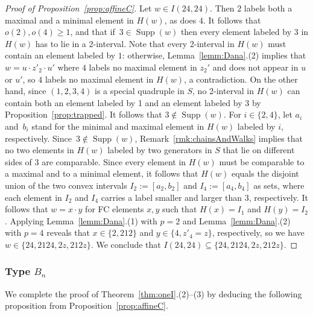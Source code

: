 \documentclass[ALCO,Unicode,published]{cedram}
\newcommand{\se}{\subseteq}
\DeclareMathOperator{\supp}{\mathrm{Supp}}
\begin{document}
\begin{proof}[Proof of Proposition~\ref{prop:affineC}]
    Let $w\in I(24,24)$.  Then $2$ labels both a maximal and a minimal element in $H(w)$, as does $4$.
    It follows that $o(2),o(4)\ge 1$, and that if~$3\in \supp(w)$ then every element labeled by $3$ in
    $H(w)$ has to lie in a 2-interval.  Note that every 2-interval in $H(w)$ must contain an element
    labeled by $1$: otherwise, Lemma~\ref{lemm:Dana}.(2) implies that $w=u\cdot z'_2\cdot u'$ where $4$
    labels no maximal element in $z_2'$ and does not appear in $u$ or $u'$, so $4$ labels no maximal
    element in $H(w)$, a contradiction.  On the other hand, since $(1,2,3,4)$ is a special quadruple
    in $S$, no 2-interval in $H(w)$ can contain both an element labeled by 1 and an element labeled
    by 3 by Proposition~\ref{prop:trapped}. It follows that $3\notin\supp(w)$.  For $i\in \{2,4\}$, let $a_i$
    and~$b_i$ stand for the minimal and maximal element in $H(w)$ labeled by $i$, respectively.
    Since~$3\notin\supp(w)$, Remark~\ref{rmk:chainsAndWalks} implies that no two elements in $H(w)$
    labeled by two generators in $S$ that lie on different sides of 3 are comparable. Since every
    element in $H(w)$ must be comparable to a maximal and to a minimal element, it follows that
    $H(w)$ equals the disjoint union of the two convex intervals $I_2:=[a_2,b_2]$ and
    $I_4:=[a_4,b_4]$ as sets, where each element in $I_2$ and $I_4$ carries a label smaller and
    larger than 3, respectively. It follows that $w=x\cdot y$ for FC elements $x,y$ such that
    $H(x)=I_1$ and $H(y)=I_2$. Applying Lemma~\ref{lemm:Dana}.(1) with $p=2$ and Lemma~\ref{lemm:Dana}.(2)
    with $p=4$ reveals that $x\in \{2,212\}$ and $y\in \{4,z'_4=z\}$, respectively, so we have $w\in
    \{24,2124, 2z, 212z\}$. We conclude that $I(24,24)\se \{24,2124, 2z, 212z\}$.  
\end{proof}

\subsubsection{Type $B_n$}
We complete the proof of Theorem~\ref{thm:oneI}.(2)--(3) by deducing the following proposition from
Proposition~\ref{prop:affineC}. 
\end{document}
